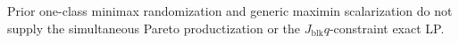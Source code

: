 Prior one-class minimax randomization and generic maximin scalarization do not supply the simultaneous Pareto productization or the \(J_{\mathrm{blk}}q\)-constraint exact LP.